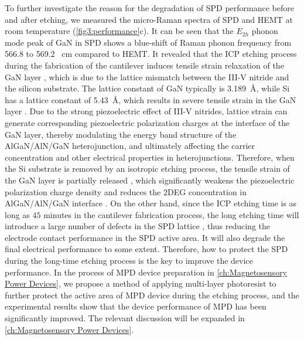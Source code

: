 To further investigate the reason for the degradation  of SPD performance before and after etching, we measured the micro-Raman spectra of SPD  and  HEMT at room temperature (\autoref{fig3:performance}c). It can be seen that the $E_{2h}$ phonon mode peak of GaN in SPD shows a blue-shift of Raman phonon frequency  from 566.8 to 569.2 \unit{\per\cm} compared to HEMT. It revealed that the ICP etching process during the fabrication of the  cantilever induces tensile strain relaxation of the GaN layer \cite{yang2015influence}, which is due to the lattice mismatch  between the III-V  nitride and the silicon  substrate. The lattice constant  of GaN typically is \SI{3.189}{\angstrom}, while Si has a lattice constant  of \SI{5.43}{\angstrom}, which results in severe tensile strain in the GaN layer \cite{cheng2015high}. Due to the strong piezoelectric effect  of III-V nitrides, lattice strain  can generate corresponding piezoelectric polarization charges  at the interface  of the GaN layer, thereby modulating the energy band  structure of the AlGaN/AlN/GaN  heterojunction, and ultimately affecting the carrier concentration  and other electrical properties in heterojunctions. Therefore, when the Si substrate is removed by an isotropic etching  process, the tensile strain of the GaN layer is partially released \cite{choi2013analysis}, which significantly weakens the piezoelectric polarization charge density  and reduces the 2DEG concentration  in AlGaN/AlN/GaN interface \cite{ambacher1999two}. On the other hand, since the ICP etching time is as long as $45$ minutes in the cantilever  fabrication process, the long etching time will introduce a large number of defects in the SPD  lattice  \cite{ladroue2010deep,pearton2000review,huang2004inductively,lan2006icp,fang2003etching}, thus reducing the electrode  contact performance in the SPD  active  area. It will also degrade the final electrical performance to some extent. Therefore, how to protect the SPD during the long-time etching process is the key to improve the device performance. In the process of MPD device preparation in \autoref{ch:Magnetosensory Power Devices}, we propose a method of applying multi-layer photoresist to further protect the active area  of MPD device during the etching process, and the experimental results show that the device performance of MPD has been significantly improved. The relevant discussion will be expanded  in \autoref{ch:Magnetosensory Power Devices}.

